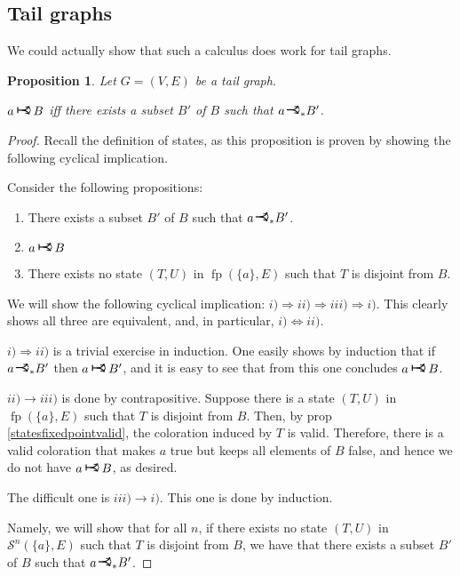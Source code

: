 \documentclass[11pt]{article}
\newcommand{\cS}{\mathcal{S}}
\DeclareMathOperator{\fp}{fp}
\newcommand{\rightcurveor}{
\!
\mathrel{
  \begin{tikzpicture}[scale=0.8]
    \draw[thick,->] (0,0) arc (90:150:-2ex);
    \draw[thick,->] (0,0) arc (90:30:2ex);
    \draw[thick] (-1ex, 0) -- (0.1ex,0);
  \end{tikzpicture}
}\!
}
\newcommand{\Rightcurveor}{
\mathrel{
  \begin{tikzpicture}[scale=0.8]
    \draw[thick,->] (0,0) arc (90:150:-2ex);
    \draw[thick,->] (0,0) arc (90:30:2ex);
    \draw[thick] (-1ex, 0) -- (0.1ex,0);
    \draw[thick] (-1ex, -0.7ex) -- (-1ex, 0.7ex);
  \end{tikzpicture}
}
}
\newtheorem{prop}{Proposition}
\begin{document}
\subsection{Tail graphs}

We could actually show that such a calculus does work for tail graphs.

\begin{prop} \label{tailgraphndirectimplicationcharacterization}
Let $G = (V,E)$ be a tail graph.

$a \Rightcurveor B$ iff there exists a subset $B'$ of $B$ such that $a \rightcurveor_* B'$.
\end{prop}

\begin{proof}
Recall the definition of states, as this proposition is proven by showing the following cyclical implication.

Consider the following propositions:

\begin{enumerate}[i]
\item There exists a subset $B'$ of $B$ such that $a \rightcurveor_* B'$.
\item $a \Rightcurveor B$
\item There exists no state $(T,U)$ in $\fp (\{a\}, E)$ such that $T$ is disjoint from $B$.
\end{enumerate}

We will show the following cyclical implication: $i) \Rightarrow ii) \Rightarrow iii) \Rightarrow i)$. This clearly shows all three are equivalent, and, in particular, $i) \Leftrightarrow ii)$.

$i) \Rightarrow ii)$ is a trivial exercise in induction. One easily shows by induction that if $a \rightcurveor_* B'$ then $a \Rightcurveor B'$, and it is easy to see that from this one concludes $a \Rightcurveor B$.

$ii) \rightarrow iii)$ is done by contrapositive. Suppose there is a state $(T, U)$ in $\fp (\{a\}, E)$ such that $T$ is disjoint from $B$. Then, by prop \ref{statesfixedpointvalid}, the coloration induced by $T$ is valid. Therefore, there is a valid coloration that makes $a$ true but keeps all elements of $B$ false, and hence we do not have $a \Rightcurveor B$, as desired.

The difficult one is $iii) \rightarrow i)$. This one is done by induction.

Namely, we will show that for all $n$, if there exists no state $(T,U)$ in $\cS^n (\{a\}, E)$ such that $T$ is disjoint from $B$, we have that there exists a subset $B'$ of $B$ such that $a \rightcurveor_* B'$.


\end{proof}
\end{document}
